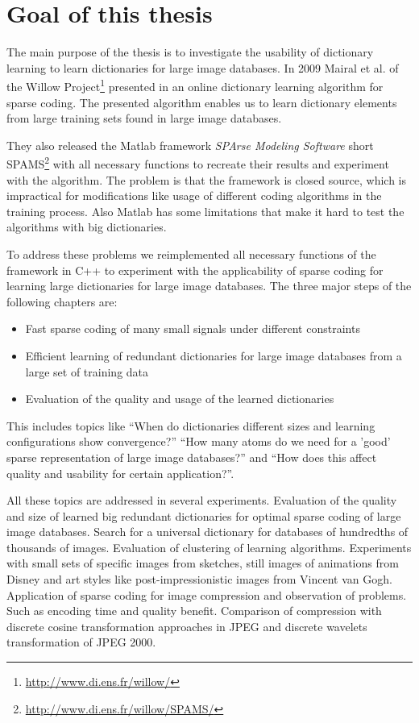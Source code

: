 \section{Goal of this thesis}
The main purpose of the thesis is to investigate the usability of dictionary
learning to learn dictionaries for large image databases. 
In 2009 Mairal et al. of the Willow
Project\footnote{\url{http://www.di.ens.fr/willow/}} presented in
\cite{Mairal2009,Mairal2010} an online dictionary learning algorithm for sparse
coding. The presented algorithm enables us to learn dictionary elements from
large training sets found in large image databases.

They also released the Matlab framework \emph{SPArse Modeling Software}
short SPAMS\footnote{\url{http://www.di.ens.fr/willow/SPAMS/}} with all
necessary functions to recreate their results and experiment with the algorithm.
The problem is that the framework is closed source, which is impractical for
modifications like usage of different coding algorithms in the training process.
Also Matlab has some limitations that make it hard to test the algorithms with
big dictionaries.

To address these problems we reimplemented all necessary functions of the
framework in C++ to experiment with the applicability of sparse coding for
learning large dictionaries for large image databases. The three major steps of
the following chapters are:

\begin{itemize}
 \item Fast sparse coding of many small signals under different constraints
 \item Efficient learning of redundant dictionaries for large image databases
from a large set of training data
 \item Evaluation of the quality and usage of the learned dictionaries
\end{itemize}

This includes topics like 
``When do dictionaries different sizes and learning configurations show
convergence?'' 
``How many atoms do we need for a 'good' sparse representation of large image
databases?''  and 
``How does this affect quality and usability for certain application?''. 

All these topics are addressed in several experiments.
Evaluation of the quality and size of learned big redundant dictionaries
for optimal sparse coding of large image databases. Search for a universal
dictionary for databases of hundredths of thousands of images. Evaluation of
clustering of learning algorithms. Experiments with small sets of specific
images from sketches, still images of animations from Disney and art styles like
post-impressionistic images from Vincent van Gogh.
Application of sparse coding for image compression and observation of problems.
Such as encoding time and quality benefit. Comparison of compression with
discrete cosine transformation approaches in JPEG and discrete wavelets
transformation of JPEG 2000.




